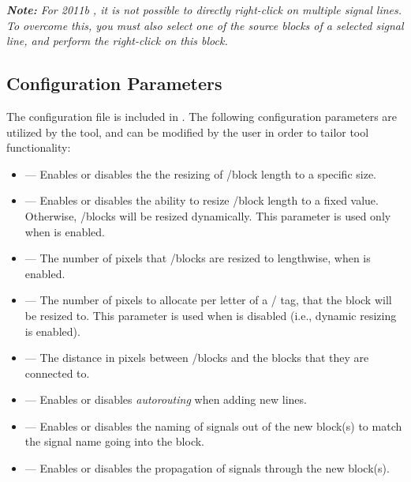 \documentclass{article}
\newcommand{\toolFolder}{\cmd{LineToGotoFrom}}
\begin{document}
\textit{\textbf{Note:} For \Matlab 2011b \Simulink, it is not possible to directly right-click on multiple signal lines. To overcome this, you must also select one of the source blocks of a selected signal line, and perform the right-click on this block.}

\subsection{Configuration Parameters}
The configuration file  is included in \cmd{\toolFolder\textbackslash src}. The following configuration parameters are utilized by the tool, and can be modified by the user in order to tailor tool functionality:

\begin{itemize}
	\item {} --- Enables or disables the the resizing of \goto/\from block length to a specific size.
	\item {} --- Enables or disables the ability to resize \goto/\from block length to a fixed value. Otherwise, \goto/\from blocks will be resized dynamically. This parameter is used only when  is enabled.
	\item {} --- The number of pixels that \goto/\from blocks are resized to lengthwise, when  is enabled.
	\item {} --- The number of pixels to allocate per letter of a \goto/\from
tag, that the block will be resized to. This parameter is used when  is disabled (i.e., dynamic resizing is enabled).
	\item {} --- The distance in pixels between \goto/\from blocks and the blocks that they are connected to.
	\item {} --- Enables or disables \emph{autorouting} when adding new lines. 
	\item {} --- Enables or disables the naming of signals out of the new \from block(s) to match the signal name going into the \goto block.
	\item {} --- Enables or disables the propagation of signals through the new \from block(s).
\end{itemize}
\end{document}

